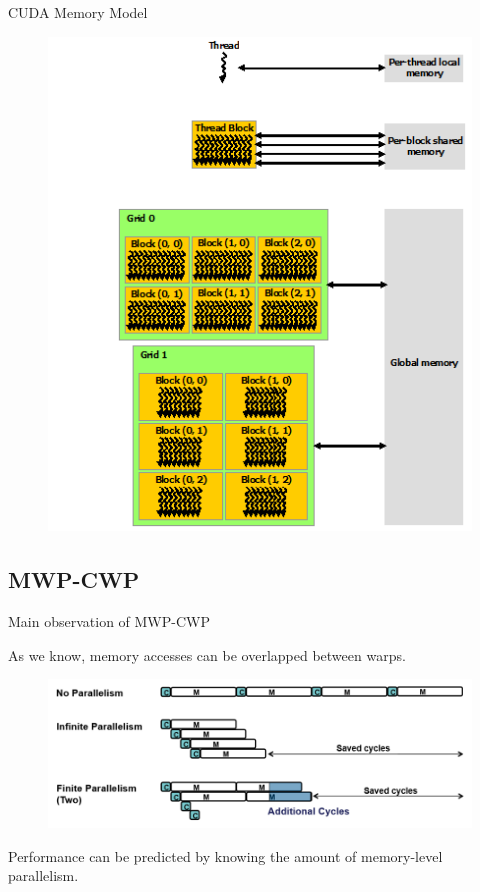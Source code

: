 \begin{frame}{CUDA Memory Model}
    \begin{center}
        \begin{figure}[H]
            \includegraphics[scale=0.55]{figures/memory-hierarchy.png}
        \end{figure}
    \end{center}
\end{frame}

\subsection{MWP-CWP}
\begin{frame}[fragile]{Main observation of MWP-CWP}
	\begin{block}{}
        As we know, memory accesses can be overlapped between warps.
        \begin{center}
            \begin{figure}[H]
                \includegraphics[scale=0.6]{figures/mwp_cwp.png}
            \end{figure}
        \end{center}
        Performance can be predicted by knowing the amount of memory-level parallelism.
    \end{block}
\end{frame}

